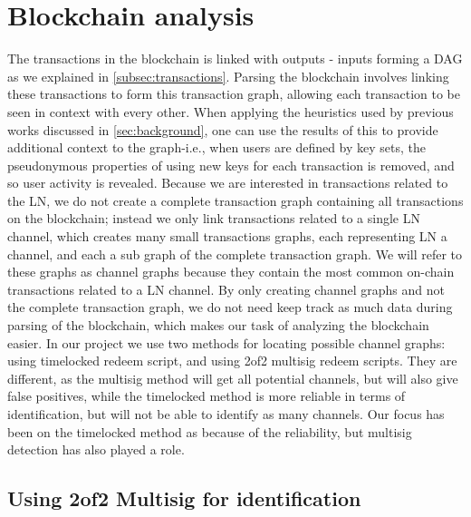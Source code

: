 \section{Blockchain analysis}
\label{blockchain_analysis}
The transactions in the blockchain is linked with outputs - inputs forming a DAG as we explained in \cref{subsec:transactions}. Parsing the blockchain involves linking these transactions to form this transaction graph, allowing each transaction to be seen in context with every other. When applying the heuristics used by previous works discussed in \cref{sec:background}, one can use the results of this to provide additional context to the graph-i.e., when users are defined by key sets, the pseudonymous properties of using new keys for each transaction is removed, and so user activity is revealed. Because we are interested in transactions related to the LN, we do not create a complete transaction graph containing all transactions on the blockchain; instead we only link transactions related to a single LN channel, which creates many small transactions graphs, each representing LN a channel, and each a sub graph of the complete transaction graph. 
We will refer to these graphs as channel graphs because they contain the most common on-chain transactions related to a LN channel.
By only creating channel graphs and not the complete transaction graph, we do not need keep track as much data during parsing of the blockchain, which makes our task of analyzing the blockchain easier. 
In our project we use two methods for locating possible channel graphs: using timelocked redeem script, and using 2of2 multisig redeem scripts.
They are different, as the multisig method will get all potential channels, but will also give false positives, while the timelocked method is more reliable in terms of identification, but will not be able to identify as many channels.
Our focus has been on the timelocked method as because of the reliability, but multisig detection has also played a role.


\subsection{Using 2of2 Multisig for identification}
\label{detection_ms}

